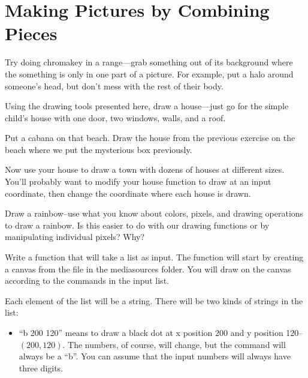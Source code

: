 \chapter[Combining Pictures]{Making Pictures by Combining Pieces}
    \graphicspath{{figs/}{figs/pictcreate/}{figs/pictencode/}}

\begin{exercises}
\begin{ex}
Try doing chromakey in a range---grab something out of its
background where the something is only in one part of a picture.
For example, put a halo around someone's head, but don't mess with
the rest of their body.
\end{ex}

\begin{ex}
Using the drawing tools presented here, draw a house---just go for
the simple child's house with one door, two windows, walls, and a
roof.
\end{ex}

\begin{ex}
Put a cabana on that beach.  Draw the house from the previous
exercise on the beach where we put the mysterious box previously.
\end{ex}

\begin{ex}
Now use your house to draw a town with dozens of houses at
different sizes. You'll probably want to modify your house
function to draw at an input coordinate, then change the
coordinate where each house is drawn.
\end{ex}

\begin{ex}
Draw a rainbow--use what you know about colors, pixels, and
drawing operations to draw a rainbow.  Is this easier to do with
our drawing functions or by manipulating individual pixels? Why?
\end{ex}

\begin{starex}
Write a function  that will take a list as input.
The function  will start by creating a canvas
from the  file in the mediasources folder.
You will draw on the canvas according to the commands in the input
list.

Each element of the list will be a string. There will be two kinds
of strings in the list:

\begin{itemize}
\item ``b 200 120'' means to draw a black dot at x position 200
and y position 120--$(200,120)$. The numbers, of course, will
change, but the command will always be a ``b''. You can assume
that the input numbers will always have three digits.


\end{itemize}
\end{starex}
\end{exercises}
